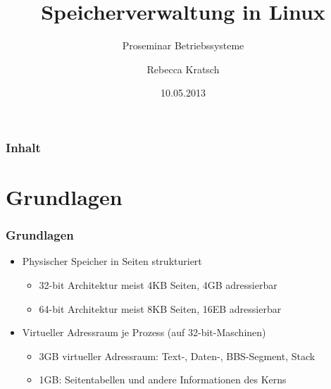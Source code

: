 \documentclass[ddcfooter,nosectionnum]{tudbeamer}
\begin{document}
\title[Speicherverwaltung in Linux]{Speicherverwaltung in Linux}
\subtitle{Proseminar Betriebssysteme}
\author{Rebecca Kratsch}

\date{10.05.2013}

\maketitle
	

\begin{frame}
    \frametitle{Inhalt}
	\tableofcontents
\end{frame}

\section{Grundlagen}
\begin{frame} 
    \frametitle{Grundlagen}
    	\begin{itemize}
			\item Physischer Speicher in Seiten strukturiert
			\begin {itemize}
				\item 32-bit Architektur meist 4KB Seiten, 4GB adressierbar
				\item 64-bit Architektur meist 8KB Seiten, 16EB adressierbar
    		\end{itemize}
			\item Virtueller Adressraum je Prozess (auf 32-bit-Maschinen)
			\begin {itemize}
				\item 3GB virtueller Adressraum: Text-, Daten-, BBS-Segment, Stack			\item 1GB: Seitentabellen und andere Informationen des Kerns    			\end{itemize}
    \end{itemize}
    \end{frame}
\end{document}
